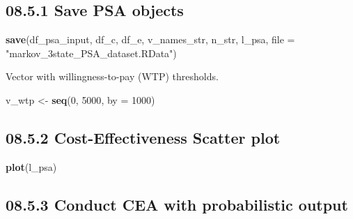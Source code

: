 \documentclass[
]{article}
\newenvironment{Shaded}{\begin{snugshade}}{\end{snugshade}}
\newcommand{\DataTypeTok}[1]{\textcolor[rgb]{0.13,0.29,0.53}{#1}}
\newcommand{\DecValTok}[1]{\textcolor[rgb]{0.00,0.00,0.81}{#1}}
\newcommand{\KeywordTok}[1]{\textcolor[rgb]{0.13,0.29,0.53}{\textbf{#1}}}
\newcommand{\NormalTok}[1]{#1}
\newcommand{\StringTok}[1]{\textcolor[rgb]{0.31,0.60,0.02}{#1}}
\begin{document}
\hypertarget{save-psa-objects}{%
\subsection{08.5.1 Save PSA objects}\label{save-psa-objects}}

\begin{Shaded}
\begin{Highlighting}[]
\KeywordTok{save}\NormalTok{(df_psa_input, df_c, df_e, v_names_str, n_str, l_psa,}
     \DataTypeTok{file =} \StringTok{"markov_3state_PSA_dataset.RData"}\NormalTok{)}
\end{Highlighting}
\end{Shaded}

Vector with willingness-to-pay (WTP) thresholds.

\begin{Shaded}
\begin{Highlighting}[]
\NormalTok{v_wtp <-}\StringTok{ }\KeywordTok{seq}\NormalTok{(}\DecValTok{0}\NormalTok{, }\DecValTok{5000}\NormalTok{, }\DataTypeTok{by =} \DecValTok{1000}\NormalTok{)}
\end{Highlighting}
\end{Shaded}

\hypertarget{cost-effectiveness-scatter-plot}{%
\subsection{08.5.2 Cost-Effectiveness Scatter
plot}\label{cost-effectiveness-scatter-plot}}

\begin{Shaded}
\begin{Highlighting}[]
\KeywordTok{plot}\NormalTok{(l_psa)}
\end{Highlighting}
\end{Shaded}

\hypertarget{conduct-cea-with-probabilistic-output}{%
\subsection{08.5.3 Conduct CEA with probabilistic
output}\label{conduct-cea-with-probabilistic-output}}
\end{document}
